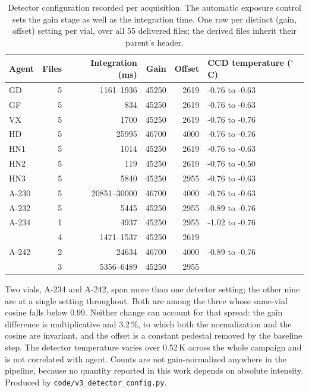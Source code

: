 \begin{table}[htbp]
\centering
\caption{Detector configuration recorded per acquisition. The automatic exposure control sets the gain stage as well as the integration time. One row per distinct (gain, offset) setting per vial, over all 55 delivered files; the derived files inherit their parent's header.}
\label{tab:si-detconfig}
\small
\begin{tabular}{lrrrrl}
\toprule
Agent & Files & Integration (ms) & Gain & Offset & CCD temperature ($^{\circ}$C) \\
\midrule
GD & 5 & 1161--1936 & 45250 & 2619 & -0.76 to -0.63 \\
GF & 5 & 834 & 45250 & 2619 & -0.76 to -0.63 \\
VX & 5 & 1700 & 45250 & 2619 & -0.76 to -0.76 \\
HD & 5 & 25995 & 46700 & 4000 & -0.76 to -0.76 \\
HN1 & 5 & 1014 & 45250 & 2619 & -0.76 to -0.63 \\
HN2 & 5 & 119 & 45250 & 2619 & -0.76 to -0.50 \\
HN3 & 5 & 5840 & 45250 & 2955 & -0.76 to -0.63 \\
A-230 & 5 & 20851--30000 & 46700 & 4000 & -0.76 to -0.63 \\
A-232 & 5 & 5445 & 45250 & 2955 & -0.89 to -0.76 \\
A-234 & 1 & 4937 & 45250 & 2955 & -1.02 to -0.76 \\
 & 4 & 1471--1537 & 45250 & 2619 &  \\
A-242 & 2 & 24634 & 46700 & 4000 & -0.89 to -0.76 \\
 & 3 & 5356--6489 & 45250 & 2955 &  \\
\bottomrule
\end{tabular}

\begin{flushleft}\footnotesize Two vials, A-234 and A-242, span more than one detector setting; the other nine are at a single setting throughout. Both are among the three whose same-vial cosine falls below 0.99. Neither change can account for that spread: the gain difference is multiplicative and 3.2\,\%, to which both the normalization and the cosine are invariant, and the offset is a constant pedestal removed by the baseline step. The detector temperature varies over 0.52\,K across the whole campaign and is not correlated with agent. Counts are not gain-normalized anywhere in the pipeline, because no quantity reported in this work depends on absolute intensity. Produced by \texttt{code/v3\_detector\_config.py}.\end{flushleft}
\end{table}
